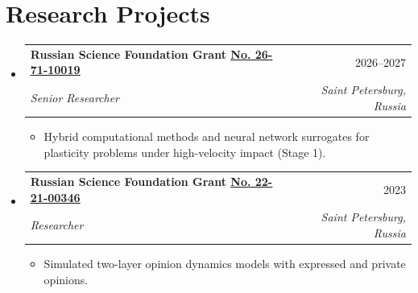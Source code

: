 \documentclass[letterpaper,10pt]{article}
\makeatletter
\newcommand{\link}[2]{\href{#1}{\color{blue}\underline{#2}}}
\newcommand{\resumeItem}[1]{
  \item\small{
    {#1 \vspace{-2pt}}
  }
}
\newcommand{\resumeSubheading}[4]{
  \vspace{-2pt}\item
  \begin{tabular*}{0.97\textwidth}[t]{l@{\extracolsep{\fill}}r}
    \textbf{#1} & #2 \\
    \textit{\small#3} & \textit{\small #4} \\
  \end{tabular*}\vspace{-7pt}
}
\newenvironment{resumeSubHeadingList}{\begin{itemize}[leftmargin=0.15in, label={}]}{\end{itemize}}
\newenvironment{resumeItemList}{\begin{itemize}}{\end{itemize}}
\makeatother
\begin{document}
\section{Research Projects}
\begin{resumeSubHeadingList}
  \resumeSubheading
    {Russian Science Foundation Grant \link{https://rscf.ru/project/26-71-10019/}{No. 26-71-10019}}{2026--2027}
    {Senior Researcher}{Saint Petersburg, Russia}
    \begin{resumeItemList}
      \resumeItem{Hybrid computational methods and neural network surrogates
                  for plasticity problems under high-velocity impact (Stage
                  1).}
    \end{resumeItemList}
  \resumeSubheading
    {Russian Science Foundation Grant \link{https://rscf.ru/en/project/22-21-00346/}{No. 22-21-00346}}{2023}
    {Researcher}{Saint Petersburg, Russia}
    \begin{resumeItemList}
      \resumeItem{Simulated two-layer opinion dynamics models with expressed
                  and private opinions.}
    \end{resumeItemList}
\end{resumeSubHeadingList}
\end{document}
